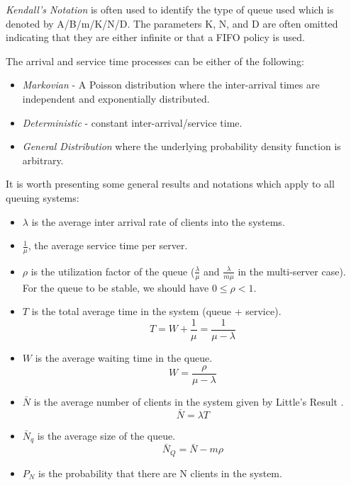 \textit{Kendall's Notation} is often used to identify the type of queue used which is denoted by A/B/m/K/N/D. The parameters K, N, and D are often omitted indicating that they are either infinite or that a FIFO policy is used. 

The arrival and service time processes can be either of the following:

\begin{itemize}
 \item \textit{Markovian} - A Poisson distribution \cite{Poisson} where the inter-arrival times are independent and exponentially distributed.
 \item \textit{Deterministic} - constant inter-arrival/service time.
 \item \textit{General Distribution} where the underlying probability density function is arbitrary.
\end{itemize}

It is worth presenting some general results and notations which apply to all queuing systems:

\begin{itemize}
 \item $\lambda$ is the average inter arrival rate of clients into the systems.
 \item $\frac{1}{\mu}$, the average service time per server.
 \item $\rho$ is the utilization factor of the queue ($\frac{\lambda}{\mu}$ and $\frac{\lambda}{m\mu}$ in the multi-server case). For the queue to be stable, we should have $0 \leq \rho < 1$.
\item $T$ is the total average time in the system (queue + service).
\begin{equation}
 T = W + \frac{1}{\mu} = \frac{1}{\mu - \lambda}
 \label{eq:GG1T}
\end{equation}
 \item $W$ is the average waiting time in the queue.
 \begin{equation}
 W = \frac{\rho}{\mu - \lambda}
 \label{eq:GG1W}
\end{equation}
 \item $\bar{N}$ is the average number of clients in the system given by Little's Result \cite{little}.
\begin{equation}
  \bar{N} = \lambda T
 \label{eq:Little}
\end{equation}
 \item $\bar{N}_q$ is the average size of the queue.
\begin{equation}
 \bar{N}_Q = \bar{N} - m\rho
 \label{eq:GG1NQ}
\end{equation}

 
 \item $P_N$ is the probability that there are N clients in the system.
\end{itemize}

